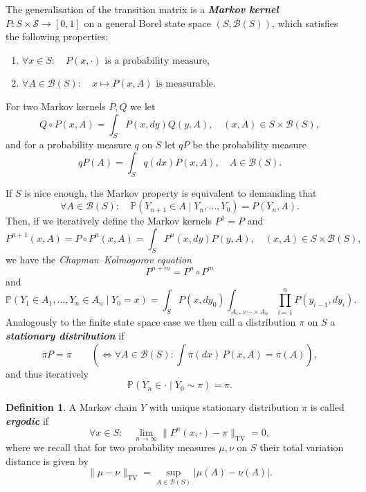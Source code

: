 \documentclass[
]{book}
\providecommand{\tightlist}{%
  \setlength{\itemsep}{0pt}\setlength{\parskip}{0pt}}
\theoremstyle{definition}
\newtheorem{definition}{Definition}[chapter]
\theoremstyle{definition}
\theoremstyle{definition}
\theoremstyle{definition}
\theoremstyle{remark}
\begin{document}
The generalisation of the transition matrix is a \textbf{\emph{Markov kernel}} \(P \colon S \times \mathcal{S} \to [0,1]\) on a general Borel state space \((S,\mathcal{B}(S))\), which satisfies the following properties:

\begin{enumerate}
\def\labelenumi{\arabic{enumi}.}
\tightlist
\item
  \(\forall x \in S: \quad P(x, \cdot) \text{ is a probability measure}\),
\item
  \(\forall A \in \mathcal{B}(S): \quad x \mapsto P(x, A) \text{ is measurable.}\)
\end{enumerate}

For two Markov kernels \(P,Q\) we let
\[Q\circ P(x,A) = \int_{S} P(x, dy ) Q(y,A), \quad (x,A) \in S \times \mathcal{B}(S),\]
and for a probability measure \(q\) on \(S\) let \(qP\) be the probability measure
\[qP(A) = \int_S q(dx) P(x,A), \quad A \in \mathcal{B}(S).\]

If \(S\) is nice enough, the Markov property is equivalent to demanding that
\[\forall A \in \mathcal{B}(S): \quad \mathbb{P}(Y_{n+1} \in A \mid Y_n, \ldots, Y_0) = P(Y_n, A). \]
Then, if we iteratively define the Markov kernels \(P^1 = P\) and
\[P^{n+1}(x,A) = P \circ P^n(x,A) = \int_{S} P^n(x, dy) P(y, A), \quad (x,A) \in S \times \mathcal{B}(S),\]
we have the \emph{Chapman--Kolmogorov equation}
\[
P^{n+m} = P^n \circ P^m
\]
and
\[
\mathbb{P}(Y_1 \in A_1, \ldots, Y_n \in A_n \mid Y_0 = x) = \int_S P(x, dy_0)  \int_{A_1, \times \cdots \times A_n} \prod_{i=1}^n P(y_{i-1}, dy_i).
\]
Analogously to the finite state space case we then call a distribution \(\pi\) on \(S\) a \textbf{\emph{stationary distribution}} if
\[\pi P = \pi \qquad (\iff \forall A \in \mathcal{B}(S): \int \pi(dx)\, P(x,A) = \pi(A)),\]
and thus iteratively
\[\mathbb{P}(Y_n \in \cdot \mid Y_0 \sim \pi) = \pi.\]

\begin{definition}
A Markov chain \(Y\) with unique stationary distribution \(\pi\) is called \textbf{\emph{ergodic}} if
\[\forall x \in S: \quad \lim_{n \to \infty} \lVert P^n(x,\cdot) - \pi \rVert_{\mathrm{TV}} = 0,\]
where we recall that for two probability measures \(\mu,\nu\) on \(S\) their total variation distance is given by
\[\lVert \mu - \nu \rVert_{\mathrm{TV}} = \sup_{A \in \mathcal{B}(S)} \lvert \mu(A) - \nu(A) \rvert.\]
\end{definition}
\end{document}
